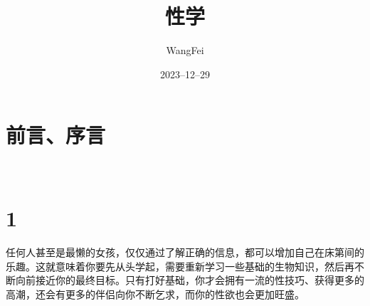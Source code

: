\documentclass[12pt,UTF8]{ctexbook}
\title{\heiti\zihao{0} 性学}
\author{WangFei}
\date{2023--12--29}
\begin{document}
\maketitle
\tableofcontents

\frontmatter
\chapter{前言、序言}

\mainmatter

~\\

 \qquad  

\chapter{1}

任何人甚至是最懒的女孩，仅仅通过了解正确的信息，都可以增加自己在床第间的乐趣。这就意味着你要先从头学起，需要重新学习一些基础的生物知识，然后再不断向前接近你的最终目标。只有打好基础，你才会拥有一流的性技巧、获得更多的高潮，还会有更多的伴侣向你不断乞求，而你的性欲也会更加旺盛。
\end{document}
